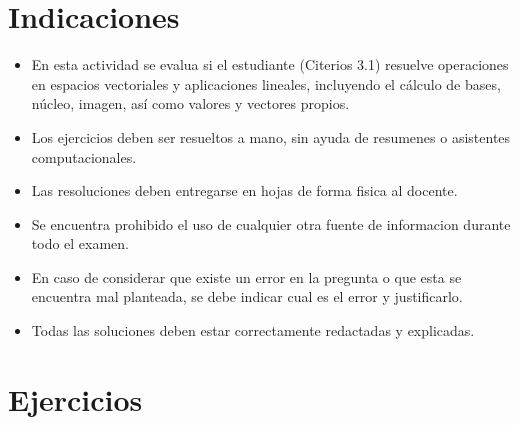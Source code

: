 \documentclass[11pt,respuestas,a4]{aleph-examen}
\begin{document}
\encabezado

\vspace{-5mm}\small
\section*{Indicaciones}
\begin{itemize}[leftmargin=*]
\item
    En esta actividad se evalua si el estudiante (Citerios 3.1) resuelve operaciones en espacios vectoriales y aplicaciones lineales, incluyendo el cálculo de bases, núcleo, imagen, así como valores y vectores propios.
\item
    Los ejercicios deben ser resueltos a mano, sin ayuda de resumenes o asistentes computacionales.
\item
    Las resoluciones deben entregarse en hojas de forma fisica al docente.
\item
    Se encuentra prohibido el uso de cualquier otra fuente de informacion durante todo el examen.
\item
    En caso de considerar que existe un error en la pregunta o que esta se encuentra mal planteada, se debe indicar cual es el error y justificarlo.
\item
    Todas las soluciones deben estar correctamente redactadas y explicadas. 
\end{itemize}

\section*{Ejercicios}
\end{document}
